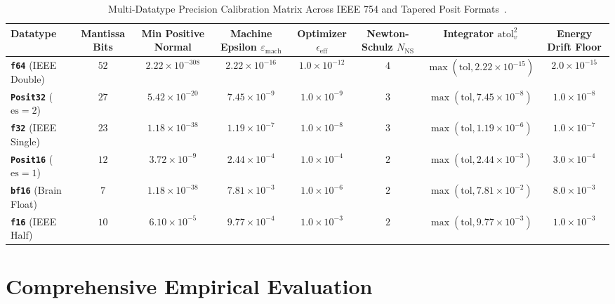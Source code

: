 \documentclass[10pt,twocolumn,letterpaper]{article}
\theoremstyle{definition}
\theoremstyle{remark}
\newcommand{\epsmach}{\varepsilon_{\mathrm{mach}}}
\newcommand{\epseff}{\epsilon_{\mathrm{eff}}}
\begin{document}
\begin{table}[t]
\centering
\caption{Multi-Datatype Precision Calibration Matrix Across IEEE 754 and Tapered Posit Formats~\cite{goldberg1991what,gustafson2017beating}.}
\label{tab:precision_matrix}
\footnotesize
\begin{tabular}{@{}lccccccc@{}}
\toprule
\textbf{Datatype} & \textbf{Mantissa Bits} & \textbf{Min Positive Normal} & \textbf{Machine Epsilon $\epsmach$} & \textbf{Optimizer $\epseff$} & \textbf{Newton-Schulz $N_{\mathrm{NS}}$} & \textbf{Integrator $\mathrm{atol}_v^2$} & \textbf{Energy Drift Floor} \\
\midrule
\textbf{\texttt{f64}} (IEEE Double) & $52$ & $2.22 \times 10^{-308}$ & $2.22 \times 10^{-16}$ & $1.0 \times 10^{-12}$ & $4$ & $\max(\mathrm{tol}, 2.22 \times 10^{-15})$ & $2.0 \times 10^{-15}$ \\
\textbf{\texttt{Posit32}} ($\mathrm{es}=2$) & $27$ & $5.42 \times 10^{-20}$ & $7.45 \times 10^{-9}$ & $1.0 \times 10^{-9}$ & $3$ & $\max(\mathrm{tol}, 7.45 \times 10^{-8})$ & $1.0 \times 10^{-8}$ \\
\textbf{\texttt{f32}} (IEEE Single) & $23$ & $1.18 \times 10^{-38}$ & $1.19 \times 10^{-7}$ & $1.0 \times 10^{-8}$ & $3$ & $\max(\mathrm{tol}, 1.19 \times 10^{-6})$ & $1.0 \times 10^{-7}$ \\
\textbf{\texttt{Posit16}} ($\mathrm{es}=1$) & $12$ & $3.72 \times 10^{-9}$ & $2.44 \times 10^{-4}$ & $1.0 \times 10^{-4}$ & $2$ & $\max(\mathrm{tol}, 2.44 \times 10^{-3})$ & $3.0 \times 10^{-4}$ \\
\textbf{\texttt{bf16}} (Brain Float) & $7$ & $1.18 \times 10^{-38}$ & $7.81 \times 10^{-3}$ & $1.0 \times 10^{-6}$ & $2$ & $\max(\mathrm{tol}, 7.81 \times 10^{-2})$ & $8.0 \times 10^{-3}$ \\
\textbf{\texttt{f16}} (IEEE Half) & $10$ & $6.10 \times 10^{-5}$ & $9.77 \times 10^{-4}$ & $1.0 \times 10^{-3}$ & $2$ & $\max(\mathrm{tol}, 9.77 \times 10^{-3})$ & $1.0 \times 10^{-3}$ \\
\bottomrule
\end{tabular}
\end{table}

\section{Comprehensive Empirical Evaluation}
\label{sec:experiments}
\end{document}
